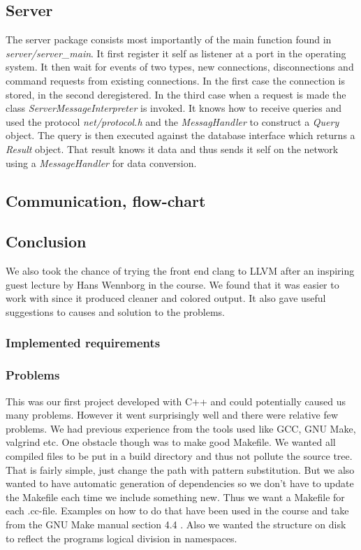 \documentclass[10pt, a4paper]{article}
\begin{document}
\subsection{Server}
The server package consists most importantly of the main function found in \emph{server/server\_main}. It first register it self as listener at a port in the operating system. It then wait for events of two types, new connections, disconnections and command requests from existing connections. In the first case the connection is stored, in the second deregistered. In the third case when a request is made the class \emph{ServerMessageInterpreter} is invoked. It knows how to receive queries and used the protocol \emph{net/protocol.h} and the \emph{MessagHandler} to construct a \emph{Query} object. The query is then executed against the database interface which returns a \emph{Result} object. That result knows it data and thus sends it self on the network using a \emph{MessageHandler} for data conversion.

\subsection{Communication, flow-chart}

\subsection{Conclusion}


We also took the chance of trying the front end clang to LLVM after an inspiring guest lecture by Hans Wennborg in the course. We found that it was easier to work with since it produced cleaner and colored output. It also gave useful suggestions to causes and solution to the problems.

\subsubsection{Implemented requirements}

\subsubsection{Problems}
This was our first project developed with C++ and could potentially caused us many problems. However it went surprisingly well and there were relative few problems. We had previous experience from the tools used like GCC, GNU Make, valgrind etc. One obstacle though was to make good Makefile. We wanted all compiled files to be put in a build directory and thus not pollute the source tree. That is fairly simple, just change the path with pattern substitution. But we also wanted to have automatic generation of dependencies so we don't have to update the Makefile each time we include something new. Thus we want a Makefile for each .cc-file. Examples on how to do that have been used in the course and take from the GNU Make manual section 4.4 \cite{makeman}. Also we wanted the structure on disk to reflect the programs logical division in namespaces.
\end{document}
